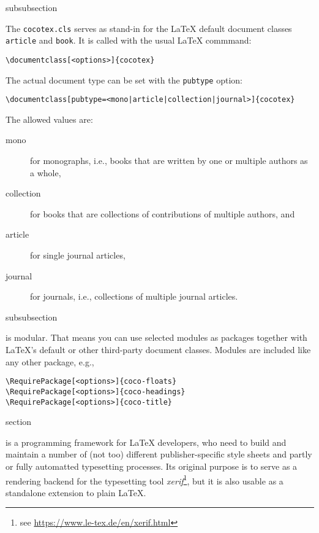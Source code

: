 \begin{Heading}{subsubsection}
\end{Heading}

The \lstinline{cocotex.cls} serves as stand-in for the {\LaTeX}
default document classes \lstinline{article} and \lstinline{book}. It
is called with the usual {\LaTeX} commmand:
\begin{lstlisting}[style=tex]
\documentclass[<options>]{cocotex}
\end{lstlisting}

The actual document type can be set with the \lstinline{pubtype} option:
\begin{lstlisting}[style=tex]
\documentclass[pubtype=<mono|article|collection|journal>]{cocotex}
\end{lstlisting}
The allowed values are:
\begin{description}
\item[\ttfamily mono] for monographs, i.e., books that are written by one or
  multiple authors as a whole,
\item[\ttfamily collection] for books that are collections of contributions of
  multiple authors, and
\item[\ttfamily article] for single journal articles,
\item[\ttfamily journal] for journals, i.e., collections of multiple journal
  articles.
\end{description}


\begin{Heading}[label=sec:modules]{subsubsection}
\end{Heading}

{\CoCoTeX} is modular. That means you can use selected modules as
packages together with \LaTeX's default or other third-party document
classes. Modules are included like any other package, e.g.,
\begin{lstlisting}[style=tex]
\RequirePackage[<options>]{coco-floats}
\RequirePackage[<options>]{coco-headings}
\RequirePackage[<options>]{coco-title}
\end{lstlisting}

\begin{Heading}{section}
\end{Heading}

{\CoCoTeX} is a programming framework for {\LaTeX} developers, who
need to build and maintain a number of (not too) different
publisher-specific style sheets and partly or fully automatted
typesetting processes. Its original purpose is to serve as a rendering
backend for the typesetting tool \textit{xerif}\footnote{see \url{https://www.le-tex.de/en/xerif.html}}, but it is also usable
as a standalone extension to plain {\LaTeX}.

